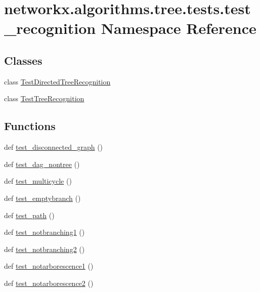 \hypertarget{namespacenetworkx_1_1algorithms_1_1tree_1_1tests_1_1test__recognition}{}\section{networkx.\+algorithms.\+tree.\+tests.\+test\+\_\+recognition Namespace Reference}
\label{namespacenetworkx_1_1algorithms_1_1tree_1_1tests_1_1test__recognition}
\subsection*{Classes}
\begin{DoxyCompactItemize}
\item 
class \hyperlink{classnetworkx_1_1algorithms_1_1tree_1_1tests_1_1test__recognition_1_1TestDirectedTreeRecognition}{Test\+Directed\+Tree\+Recognition}
\item 
class \hyperlink{classnetworkx_1_1algorithms_1_1tree_1_1tests_1_1test__recognition_1_1TestTreeRecognition}{Test\+Tree\+Recognition}
\end{DoxyCompactItemize}
\subsection*{Functions}
\begin{DoxyCompactItemize}
\item 
def \hyperlink{namespacenetworkx_1_1algorithms_1_1tree_1_1tests_1_1test__recognition_a889505fe9ce988c1745993c8fca84b52}{test\+\_\+disconnected\+\_\+graph} ()
\item 
def \hyperlink{namespacenetworkx_1_1algorithms_1_1tree_1_1tests_1_1test__recognition_aeacb5a162369639995237e15cea492e6}{test\+\_\+dag\+\_\+nontree} ()
\item 
def \hyperlink{namespacenetworkx_1_1algorithms_1_1tree_1_1tests_1_1test__recognition_ae46fb25091040bc9eeb7ec9b2b21bbfb}{test\+\_\+multicycle} ()
\item 
def \hyperlink{namespacenetworkx_1_1algorithms_1_1tree_1_1tests_1_1test__recognition_adb3571a6a8b1c78ce6a8c871dd1e31e6}{test\+\_\+emptybranch} ()
\item 
def \hyperlink{namespacenetworkx_1_1algorithms_1_1tree_1_1tests_1_1test__recognition_af136607c71ec6d9bc6790ed29e81597e}{test\+\_\+path} ()
\item 
def \hyperlink{namespacenetworkx_1_1algorithms_1_1tree_1_1tests_1_1test__recognition_ad54719b03ebb0516e5fbdb8e34c2311a}{test\+\_\+notbranching1} ()
\item 
def \hyperlink{namespacenetworkx_1_1algorithms_1_1tree_1_1tests_1_1test__recognition_ae6a80981014efc56f3881d2c0f303274}{test\+\_\+notbranching2} ()
\item 
def \hyperlink{namespacenetworkx_1_1algorithms_1_1tree_1_1tests_1_1test__recognition_a24e94e0ade7236bae8d49c9f58fa04c6}{test\+\_\+notarborescence1} ()
\item 
def \hyperlink{namespacenetworkx_1_1algorithms_1_1tree_1_1tests_1_1test__recognition_a5dc14e1199084ac02770b2f9a16c8726}{test\+\_\+notarborescence2} ()
\end{DoxyCompactItemize}


